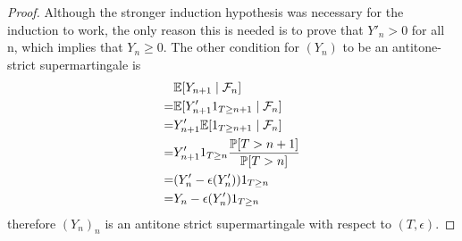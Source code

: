 \begin{proof}
Although the stronger induction hypothesis was necessary for the induction to work, the only reason this is needed is to prove that $Y'_n > 0$ for all n, which implies that $Y_n \geq 0$. The other condition for $(Y_n)$ to be an antitone-strict supermartingale is  \\
\begin{align*}
    & \mathbb{E}[Y_{n+1} \mid \mathcal F_n] \\
    = & \mathbb{E}[Y'_{n+1} 1_{T \geq n+1} \mid \mathcal F_n] \\
    = & Y'_{n+1} \mathbb{E}[1_{T \geq n+1} \mid \mathcal F_n] \\ 
    = & Y'_{n+1} 1_{T \geq n} \frac{\mathbb P[T > n+1]}{\mathbb P[T > n]} \\
    = & (Y'_n - \epsilon(Y'_n)) 1_{T \geq n} \\
    = & Y_n - \epsilon(Y'_n) 1_{T \geq n}
\end{align*}
therefore $(Y_n)_n$ is an antitone strict supermartingale with respect to $(T,\epsilon)$.
\end{proof}


